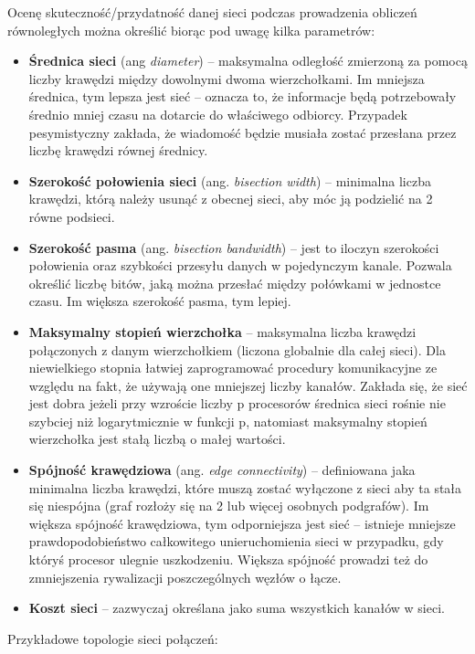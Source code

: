 Ocenę skuteczność/przydatność danej sieci podczas prowadzenia obliczeń równoległych można określić biorąc pod uwagę kilka parametrów:

\begin{itemize}
	\item \textbf{Średnica sieci} (ang \textit{diameter}) -- maksymalna odległość zmierzoną za pomocą liczby krawędzi między dowolnymi dwoma wierzchołkami. Im mniejsza średnica, tym lepsza jest sieć -- oznacza to, że informacje będą potrzebowały średnio mniej czasu na dotarcie do właściwego odbiorcy. Przypadek pesymistyczny zakłada, że wiadomość będzie musiała zostać przesłana przez liczbę krawędzi równej średnicy.
	\item \textbf{Szerokość połowienia sieci} (ang. \textit{bisection width}) -- minimalna liczba krawędzi, którą należy usunąć z obecnej sieci, aby móc ją podzielić na 2 równe podsieci.
	\item \textbf{Szerokość pasma} (ang. \textit{bisection bandwidth}) -- jest to iloczyn szerokości połowienia oraz szybkości przesyłu danych w pojedynczym kanale. Pozwala określić liczbę bitów, jaką można przesłać między połówkami w jednostce czasu. Im większa szerokość pasma, tym lepiej.
	\item \textbf{Maksymalny stopień wierzchołka} -- maksymalna liczba krawędzi połączonych z danym wierzchołkiem (liczona globalnie dla całej sieci). Dla niewielkiego stopnia łatwiej zaprogramować procedury komunikacyjne ze względu na fakt, że używają one mniejszej liczby kanałów. Zakłada się, że sieć jest dobra jeżeli przy wzroście liczby p procesorów średnica sieci rośnie nie szybciej niż logarytmicznie w funkcji p, natomiast maksymalny stopień wierzchołka jest stałą liczbą o małej wartości.
	\item \textbf{Spójność krawędziowa} (ang. \textit{edge connectivity}) -- definiowana jaka minimalna liczba krawędzi, które muszą zostać wyłączone z sieci aby ta stała się niespójna (graf rozłoży się na 2 lub więcej osobnych podgrafów). Im większa spójność krawędziowa, tym odporniejsza jest sieć -- istnieje mniejsze prawdopodobieństwo całkowitego unieruchomienia sieci w przypadku, gdy któryś procesor ulegnie uszkodzeniu. Większa spójność prowadzi też do zmniejszenia rywalizacji poszczególnych węzłów o łącze.
	\item \textbf{Koszt sieci} -- zazwyczaj określana jako suma wszystkich kanałów w sieci.
\end{itemize}

Przykładowe topologie sieci połączeń:

